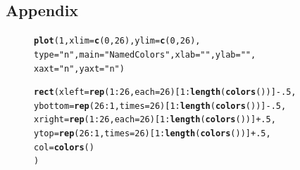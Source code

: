 \documentclass{tufte-book}\usepackage[]{graphicx}\usepackage[]{color}
\makeatletter
\newcommand{\hlnum}[1]{\textcolor[rgb]{0.686,0.059,0.569}{#1}}%
\newcommand{\hlstr}[1]{\textcolor[rgb]{0.192,0.494,0.8}{#1}}%
\newcommand{\hlopt}[1]{\textcolor[rgb]{0,0,0}{#1}}%
\newcommand{\hlstd}[1]{\textcolor[rgb]{0.345,0.345,0.345}{#1}}%
\newcommand{\hlkwc}[1]{\textcolor[rgb]{0.333,0.667,0.333}{#1}}%
\newcommand{\hlkwd}[1]{\textcolor[rgb]{0.737,0.353,0.396}{\textbf{#1}}}%
\newenvironment{kframe}{%
 \def\at@end@of@kframe{}%
 \ifinner\ifhmode%
  \def\at@end@of@kframe{\end{minipage}}%
  \begin{minipage}{\columnwidth}%
 \fi\fi%
 \def\FrameCommand##1{\hskip\@totalleftmargin \hskip-\fboxsep
 \colorbox{shadecolor}{##1}\hskip-\fboxsep
     \hskip-\linewidth \hskip-\@totalleftmargin \hskip\columnwidth}%
 \MakeFramed {\advance\hsize-\width
   \@totalleftmargin\z@ \linewidth\hsize
   \@setminipage}}%
 {\par\unskip\endMakeFramed%
 \at@end@of@kframe}
\newenvironment{knitrout}{}{} %
\makeatother
\begin{document}
\begin{footnotesize}
\chapter{Appendix}
\label{ch:X}

\begin{figure}[h]
\begin{footnotesize}
\begin{knitrout}
\color{fgcolor}\begin{kframe}
\begin{alltt}
\hlkwd{plot}\hlstd{(}\hlnum{1}\hlstd{,} \hlkwc{xlim} \hlstd{=} \hlkwd{c}\hlstd{(}\hlnum{0}\hlstd{,} \hlnum{26}\hlstd{),} \hlkwc{ylim} \hlstd{=} \hlkwd{c}\hlstd{(}\hlnum{0}\hlstd{,} \hlnum{26}\hlstd{),}
     \hlkwc{type} \hlstd{=} \hlstr{"n"}\hlstd{,} \hlkwc{main} \hlstd{=} \hlstr{"Named Colors"}\hlstd{,} \hlkwc{xlab} \hlstd{=} \hlstr{""}\hlstd{,} \hlkwc{ylab} \hlstd{=} \hlstr{""}\hlstd{,}
     \hlkwc{xaxt} \hlstd{=} \hlstr{"n"}\hlstd{,} \hlkwc{yaxt} \hlstd{=} \hlstr{"n"}\hlstd{)}

\hlkwd{rect}\hlstd{(}\hlkwc{xleft} \hlstd{=} \hlkwd{rep}\hlstd{(}\hlnum{1}\hlopt{:}\hlnum{26}\hlstd{,} \hlkwc{each} \hlstd{=} \hlnum{26}\hlstd{)[}\hlnum{1}\hlopt{:}\hlkwd{length}\hlstd{(}\hlkwd{colors}\hlstd{())]} \hlopt{-} \hlnum{.5}\hlstd{,}
     \hlkwc{ybottom} \hlstd{=} \hlkwd{rep}\hlstd{(}\hlnum{26}\hlopt{:}\hlnum{1}\hlstd{,} \hlkwc{times} \hlstd{=} \hlnum{26}\hlstd{)[}\hlnum{1}\hlopt{:}\hlkwd{length}\hlstd{(}\hlkwd{colors}\hlstd{())]} \hlopt{-} \hlnum{.5}\hlstd{,}
     \hlkwc{xright} \hlstd{=} \hlkwd{rep}\hlstd{(}\hlnum{1}\hlopt{:}\hlnum{26}\hlstd{,} \hlkwc{each} \hlstd{=} \hlnum{26}\hlstd{)[}\hlnum{1}\hlopt{:}\hlkwd{length}\hlstd{(}\hlkwd{colors}\hlstd{())]} \hlopt{+} \hlnum{.5}\hlstd{,}
     \hlkwc{ytop} \hlstd{=} \hlkwd{rep}\hlstd{(}\hlnum{26}\hlopt{:}\hlnum{1}\hlstd{,} \hlkwc{times} \hlstd{=} \hlnum{26}\hlstd{)[}\hlnum{1}\hlopt{:}\hlkwd{length}\hlstd{(}\hlkwd{colors}\hlstd{())]} \hlopt{+} \hlnum{.5}\hlstd{,}
     \hlkwc{col} \hlstd{=} \hlkwd{colors}\hlstd{()}
     \hlstd{)}


\end{alltt}
\end{kframe}
\end{knitrout}
\end{footnotesize}
\end{figure}
\end{footnotesize}
\end{document}
